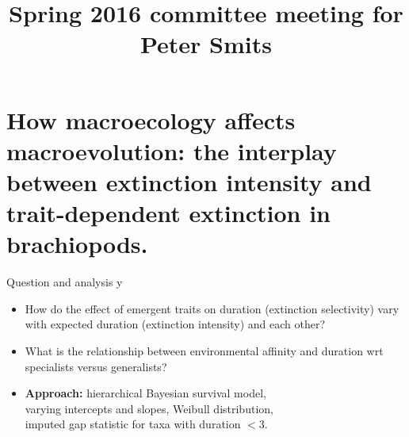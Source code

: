 \documentclass{beamer}
\title{Spring 2016 committee meeting for Peter Smits}
\author{}
\institute{}
\date{}
\begin{document}
\begin{frame}
  \maketitle
\end{frame}

\begin{frame}
  \tableofcontents
\end{frame}


\section{How macroecology affects macroevolution: the interplay between extinction intensity and trait-dependent extinction in brachiopods.}

\begin{frame}
  \begin{alertblock}{Question and analysis}
y   \begin{itemize}
      \item How do the effect of emergent traits on duration (\alert{extinction selectivity}) vary with expected duration (\alert{extinction intensity}) and each other?
      \item What is the relationship between environmental affinity and duration wrt specialists versus generalists?
      \item \textbf{Approach:} hierarchical Bayesian survival model, \\varying intercepts and slopes, Weibull distribution, \\imputed gap statistic for taxa with duration \(< 3\).
    \end{itemize}
  \end{alertblock}
\end{frame}
\end{document}
